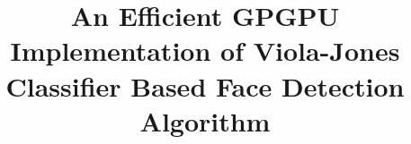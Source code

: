 \title{
\vspace{-0.15in}
An Efficient GPGPU Implementation of Viola-Jones Classifier Based Face Detection Algorithm
\vspace{-0.15in}
}

